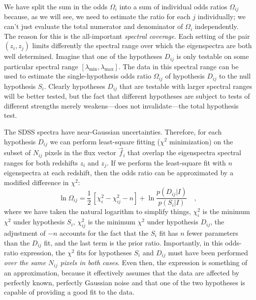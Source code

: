 \documentclass[12pt]{article}
\newcommand{\fluxvec}{\vec{f}}
\begin{document}
We have split the sum in the odds $\Omega_i$ into a sum of individual
odds ratios $\Omega_{ij}$ because, as we will see, we need to estimate
the ratio for each $j$ individually; we can't just evaluate the total
numerator and denominator of $\Omega_i$ independently.  The reason for
this is the all-important \emph{spectral coverage}.  Each setting of
the pair $(z_i,z_j)$ limits differently the spectral range over which
the eigenspectra are both well determined.  Imagine that one of the
hypotheses $D_{ij}$ is only testable on some particular spectral range
$[\lambda_{\min},\lambda_{\max}]$.  The data in this spectral range
can be used to estimate the single-hypothesis odds ratio $\Omega_{ij}$
of hypothesis $D_{ij}$ to the null hypothesis $S_i$.  Clearly
hypotheses $D_{ij}$ that are testable with larger spectral ranges will
be better tested, but the fact that different hypotheses are subject
to tests of different strengths merely weakens---does not
invalidate---the total hypothesis test.

The SDSS spectra have near-Gaussian uncertainties.
Therefore, for each hypothesis $D_{ij}$ we can perform least-square
fitting ($\chi^2$ minimization) on the subset of $N_{ij}$ pixels in
the flux vector $\fluxvec_i$ that overlap the eigenspectra spectral
ranges for both redshifts $z_i$ and $z_j$.  If we perform the
least-square fit with $n$ eigenspectra at each redshift, then the odds
ratio can be approximated by a modified difference in $\chi^2$:
\begin{equation}
\ln\Omega_{ij}= \frac{1}{2}\,\left[\chi^2_i-\chi^2_{ij}-n\right]
 +\ln\frac{p(D_{ij}|I)}{p(S_i|I)} \quad,
\end{equation}
where we have taken the natural logarithm to simplify things,
$\chi^2_i$ is the minimum $\chi^2$ under hypothesis $S_i$,
$\chi^2_{ij}$ is the minimum $\chi^2$ under hypothesis $D_{ij}$, the
adjustment of $-n$ accounts for the fact that the $S_i$ fit has $n$
fewer parameters than the $D_{ij}$ fit, and the last term is the prior
ratio.  Importantly, in this odds-ratio expression, the $\chi^2$ fits
for hypotheses $S_i$ and $D_{ij}$ must have been performed \emph{over
the same $N_{ij}$ pixels in both cases}.  Even then, the expression is
something of an approximation, because it effectively assumes that the
data are affected by perfectly known, perfectly Gaussian noise and
that one of the two hypotheses is capable of providing a good fit to
the data.
\end{document}
